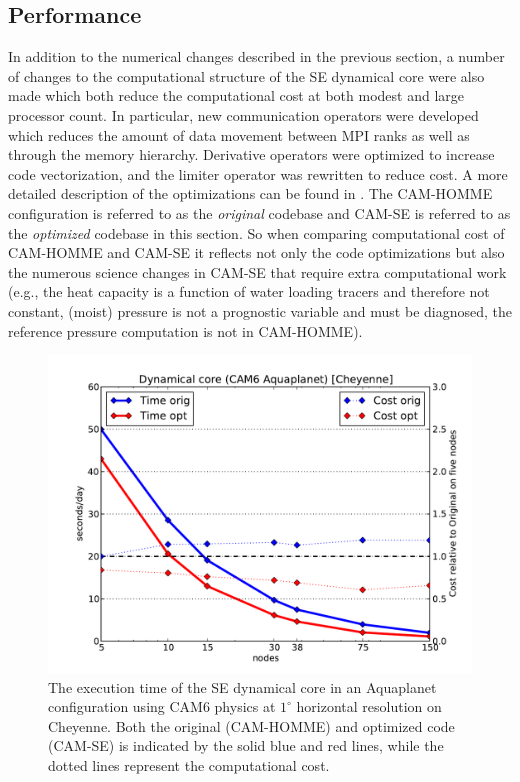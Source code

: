 \documentclass{agujournal}
\begin{document}
{\subsection{Performance}\label{sec:performance}
In addition to the numerical changes described in the previous section, a number of changes to the computational structure of the SE dynamical core were also made which both reduce the computational cost at both modest and large processor count.  In particular, new communication operators were developed which reduces the amount of data movement between MPI ranks as well as through the memory hierarchy. Derivative operators were optimized to increase code vectorization, and the limiter operator was rewritten to reduce cost.  A more detailed description of the optimizations can be found in \cite{dennis2017}. The CAM-HOMME configuration is referred to as the {\em{original}} codebase and CAM-SE is referred to as the {\em{optimized}} codebase in this section. So when comparing computational cost of CAM-HOMME and CAM-SE it reflects not only the code optimizations but also the numerous science changes in CAM-SE that require extra computational work (e.g., the heat capacity is a function of water loading tracers and therefore not constant, (moist) pressure is not a prognostic variable and must be diagnosed, the reference pressure computation is not in CAM-HOMME).

\begin{figure}[h]
\centering
 \includegraphics[scale=0.45]{figs/aqua-perf}
 \caption{The execution time of the SE dynamical core in an Aquaplanet configuration using CAM6 physics at $1^\circ$ horizontal resolution on Cheyenne.   Both the original (CAM-HOMME) and optimized code (CAM-SE) is indicated by the solid blue and red lines, while the dotted lines represent the computational cost.}
 \label{fig:aqua-perf}
\end{figure}

}
\end{document}
